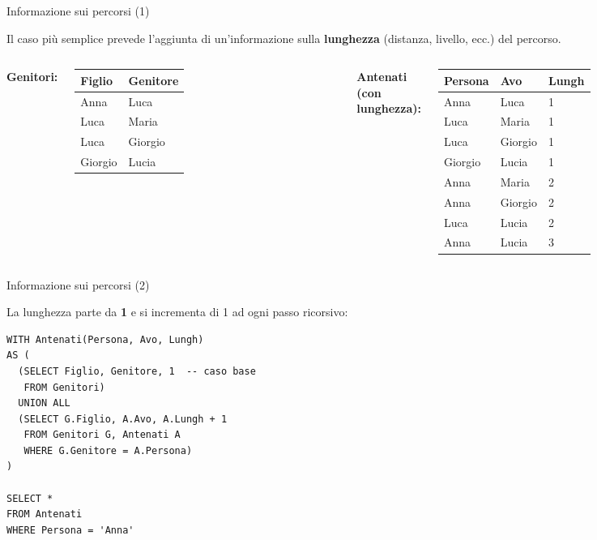\documentclass[aspectratio=169]{beamer}
\begin{document}
\begin{frame}{Informazione sui percorsi (1)}

Il caso più semplice prevede l'aggiunta di un'informazione sulla \textbf{lunghezza} (distanza, livello, ecc.) del percorso.

\vspace{8pt}
\begin{columns}[T]
\textbf{Genitori:}\\[4pt]
\small
\begin{tabular}{|l|l|}
\hline
\textbf{Figlio} & \textbf{Genitore}\\
\hline
Anna & Luca \\ Luca & Maria \\ Luca & Giorgio \\ Giorgio & Lucia \\
\hline
\end{tabular}

\textbf{Antenati (con lunghezza):}\\[4pt]
\small
\begin{tabular}{|l|l|l|}
\hline
\textbf{Persona} & \textbf{Avo} & \textbf{Lungh}\\
\hline
Anna & Luca    & 1 \\
Luca & Maria   & 1 \\
Luca & Giorgio & 1 \\
Giorgio & Lucia & 1 \\
Anna & Maria   & 2 \\
Anna & Giorgio & 2 \\
Luca & Lucia   & 2 \\
Anna & Lucia   & 3 \\
\hline
\end{tabular}
\end{columns}

\end{frame}

\begin{frame}[fragile]{Informazione sui percorsi (2)}

La lunghezza parte da \textbf{1} e si incrementa di 1 ad ogni passo ricorsivo:

\begin{lstlisting}
WITH Antenati(Persona, Avo, Lungh)
AS (
  (SELECT Figlio, Genitore, 1  -- caso base
   FROM Genitori)
  UNION ALL
  (SELECT G.Figlio, A.Avo, A.Lungh + 1
   FROM Genitori G, Antenati A
   WHERE G.Genitore = A.Persona)
)

SELECT *
FROM Antenati
WHERE Persona = 'Anna'
\end{lstlisting}

\end{frame}
\end{document}
